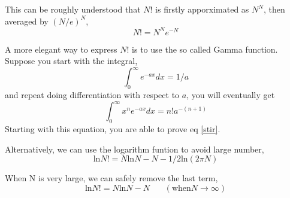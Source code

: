 \documentclass[twoside]{article}
\begin{document}
This can be roughly understood that $N$! is firstly apporximated as $N^N$, then averaged by $(N/e)^N$, 
\begin{equation}
  N! = N^N e^{-N} 
\end{equation}

A more elegant way to express $N$! is to use the so called Gamma function. Suppose you start with the integral,
\begin{equation} \int ^\infty _0 e^{-ax} dx = 1/a \end{equation}
and repeat doing differentiation with respect to $a$, you will eventually get
\begin{equation} \int ^\infty _0 x^n e^{-ax} dx = n! a^{-(n+1)} \end{equation}
Starting with this equation, you are able to prove eq \ref{stir}.


Alternatively, we can use the logarithm funtion to avoid large number,
\begin{equation}\label{s1}
  \text {ln}N! = N \text {ln}N - N - 1/2 \text {ln}(2\pi N)
\end{equation}

When N is very large, we can safely remove the last term,
\begin{equation}\label{s2}
  \text {ln}N! = N \text {ln}N - N ~~~~~~~~ (\text {when} N\rightarrow \infty )
\end{equation}
\end{document}
